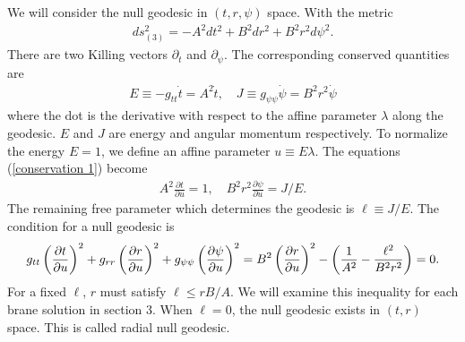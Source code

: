 \documentclass[a4paper,12pt]{article}
\begin{document}
We will consider the null geodesic in  $(t,r,\psi)$ space. 
With the metric 
\begin{eqnarray}
ds^2_{(3)}=-A^2dt^2+B^2dr^2+B^2r^2d\psi^2.
\label{trp metric}
\end{eqnarray}
There are two Killing vectors  
$\partial_t$ and $\partial_{\psi}$.
The corresponding conserved quantities are 
\begin{eqnarray}
E\equiv -g_{tt}{\dot t}=A^2{\dot t}, \quad 
J\equiv g_{\psi\psi}{\dot \psi}=B^2r^2{\dot \psi}
\label{conservation 1}
\end{eqnarray}
where the dot is the derivative with respect to the
affine parameter $\lambda$ along the geodesic.
$E$ and $J$ are energy and angular momentum respectively.
To normalize the energy $E=1$, 
we define an affine parameter $u\equiv E\lambda$.
The equations (\ref{conservation 1}) become
\begin{eqnarray}
A^2\frac{\partial t}{\partial u}=1,\quad
B^2r^2\frac{\partial \psi}{\partial u}= J/E.
\label{conservation}
\end{eqnarray}
The remaining free parameter which determines the geodesic is
$\ell\equiv J/E$.
The condition for a null geodesic is
\begin{eqnarray}
g_{tt}\left(\frac{\partial t}{\partial u}\right)^2
+g_{rr}\left(\frac{\partial r}{\partial u}\right)^2
+g_{\psi\psi}\left(\frac{\partial \psi}{\partial u}\right)^2
=B^2\left({\partial r\over \partial u}\right)^2
-\left(\frac{1}{A^2}-\frac{\ell^2}{B^2r^2}\right)
=0.
\label{EOM}
\end{eqnarray}
For a fixed $\ell$,  $r$ must satisfy $\ell\le rB/A$.
We will examine this inequality for each brane solution in section $3$.
When $\ell=0$, the null geodesic exists in $(t,r)$ space.
This is called radial null geodesic.
\end{document}
